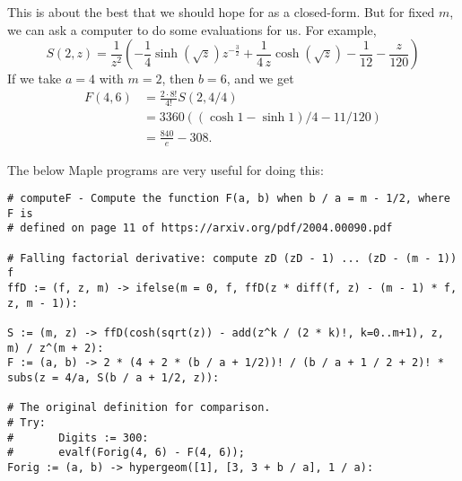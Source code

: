 \documentclass{rudin}
\begin{document}
This is about the best that we should hope for as a closed-form. But for fixed
$m$, we can ask a computer to do some evaluations for us. For example,
\begin{equation*}
    S(2, z) =
{\frac {1}{{z}^{2}} \left( -{\frac {1}{4}\sinh \left( \sqrt {z} \right) {z}^{-{\frac{3}{2}}}}+{\frac {1}{4\,z}\cosh \left( \sqrt {z}
 \right) }-{\frac{1}{12}}-{\frac {z}{120}} \right) }
\end{equation*}
If we take $a = 4$ with $m = 2$, then $b = 6$, and we get
\begin{align*}
    F(4, 6) &= \frac{2 \cdot 8!}{4!} S(2, 4 / 4) \\
            &= 3360 ((\cosh 1 - \sinh 1) / 4 - 11 / 120) \\
            &= \frac{840}{e} - 308.
\end{align*}

The below Maple programs are very useful for doing this:
\begin{verbatim}
# computeF - Compute the function F(a, b) when b / a = m - 1/2, where F is
# defined on page 11 of https://arxiv.org/pdf/2004.00090.pdf

# Falling factorial derivative: compute zD (zD - 1) ... (zD - (m - 1)) f
ffD := (f, z, m) -> ifelse(m = 0, f, ffD(z * diff(f, z) - (m - 1) * f, z, m - 1)):

S := (m, z) -> ffD(cosh(sqrt(z)) - add(z^k / (2 * k)!, k=0..m+1), z, m) / z^(m + 2):
F := (a, b) -> 2 * (4 + 2 * (b / a + 1/2))! / (b / a + 1 / 2 + 2)! * subs(z = 4/a, S(b / a + 1/2, z)):

# The original definition for comparison.
# Try:
#       Digits := 300:
#       evalf(Forig(4, 6) - F(4, 6));
Forig := (a, b) -> hypergeom([1], [3, 3 + b / a], 1 / a):

\end{verbatim}
\end{document}
